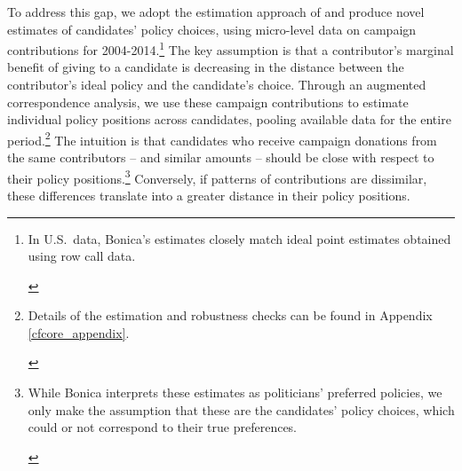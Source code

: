 \documentclass[12pt,english]{article}
\newcommand{\note}[1]{\footnote{ \begin{doublespace}#1  \end{doublespace}}}
\numberwithin{equation}{section}
\theoremstyle{plain}
\theoremstyle{remark}
\theoremstyle{plain}
\begin{document}
To address this gap, we adopt the estimation approach of  and produce novel estimates of candidates' policy choices, using micro-level data on campaign contributions for 2004-2014.\note{\normalsize In U.S.\ data, Bonica's estimates closely match ideal point estimates obtained using row call data.} The key assumption is that a contributor's marginal benefit of giving to a candidate is decreasing in the distance between the contributor's ideal policy and the candidate's choice. Through an augmented correspondence analysis, we use these campaign contributions to estimate individual policy positions across candidates, pooling available data for the entire period.\note{Details of the estimation and robustness checks can be found in Appendix \ref{cfcore_appendix}.} The intuition is that candidates who receive campaign donations from the same contributors -- and similar amounts -- should be close with respect to their policy positions.\note{\normalsize While Bonica interprets these estimates as politicians' preferred policies, we  only make the assumption that these are the candidates' policy choices, which could or not correspond to their true preferences.} Conversely, if patterns of contributions are dissimilar, these differences translate into a greater distance in their policy positions.
    
    
\end{document}

